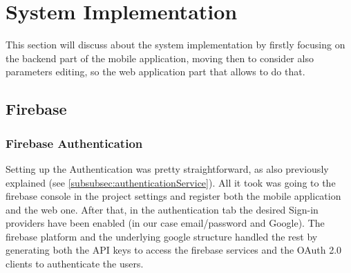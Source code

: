 \section{System Implementation}
This section will discuss about the system implementation by firstly focusing on the backend part of the mobile application, moving then to consider also parameters editing, so the web application part that allows to do that.
\subsection{Firebase}
\subsubsection{Firebase Authentication}
\label{subsubsec:firebaseAuthentication}
Setting up the Authentication was pretty straightforward, as also previously explained (see \cref{subsubsec:authenticationService}). All it took was going to the firebase console in the project settings and register both the mobile application and the web one. After that, in the authentication tab the desired Sign-in providers have been enabled (in our case email/password and Google). The firebase platform and the underlying google structure handled the rest by generating both the API keys to access the firebase services and the OAuth 2.0 clients to authenticate the users.


